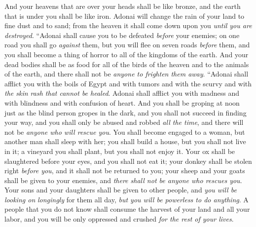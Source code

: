 \begin{biblechapter}
\verse And your heavens that are over your heads shall be like bronze, and the earth that is under you shall be like iron.
\verse Adonai will change the rain of your land to fine dust and to sand; from the heaven it shall come down upon you \textit{until you are destroyed}.
\verse “Adonai shall cause you to be defeated \textit{before} your enemies; on one road you shall go \textit{against} them, but you will flee on seven roads \textit{before} them, and you shall become a thing of horror to all of the kingdoms of the earth.
\verse And your dead bodies shall be as food for all of the birds of the heaven and to the animals of the earth, and there shall not be \textit{anyone to frighten them away}.
\verse “Adonai shall afflict you with the boils of Egypt and with tumors and with the scurvy and with \textit{the skin rash that cannot be healed}.
\verse Adonai shall afflict you with madness and with blindness and with confusion of heart.
\verse And you shall be groping at noon just as the blind person gropes in the dark, and you shall not succeed in finding your way, and you shall only be abused and robbed \textit{all the time}, and there will not be \textit{anyone who will rescue you}. 
\verse You shall become engaged to a woman, but another man shall sleep with her; you shall build a house, but you shall not live in it; a vineyard you shall plant, but you shall not enjoy it.
\verse Your ox shall be slaughtered before your eyes, and you shall not eat it; your donkey shall be stolen right \textit{before you}, and it shall not be returned to you; your sheep and your goats shall be given to your enemies, and \textit{there shall not be anyone who rescues you}.
\verse Your sons and your daughters shall be given to other people, and \textit{you will be looking on} \textit{longingly} for them all day, \textit{but you will be powerless to do anything}.
\verse A people that you do not know shall consume the harvest of your land and all your labor, and you will be only oppressed and crushed \textit{for the rest of your lives}.

\end{biblechapter}
